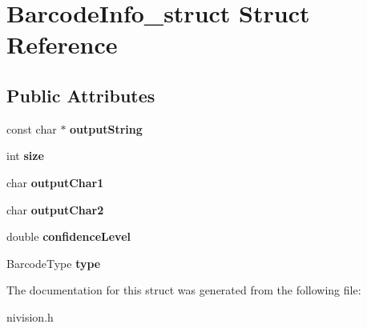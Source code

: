 \hypertarget{structBarcodeInfo__struct}{\section{\-Barcode\-Info\-\_\-struct \-Struct \-Reference}
\label{structBarcodeInfo__struct}
}
\subsection*{\-Public \-Attributes}
\begin{DoxyCompactItemize}
\item 
\hypertarget{structBarcodeInfo__struct_ab185776e7a618cbd98d26ac6726ace01}{const char $\ast$ {\bfseries output\-String}}\label{structBarcodeInfo__struct_ab185776e7a618cbd98d26ac6726ace01}

\item 
\hypertarget{structBarcodeInfo__struct_a1bcf8870fad45897861938e88889e2ff}{int {\bfseries size}}\label{structBarcodeInfo__struct_a1bcf8870fad45897861938e88889e2ff}

\item 
\hypertarget{structBarcodeInfo__struct_a27f2d0b60030e689236c43f314e12797}{char {\bfseries output\-Char1}}\label{structBarcodeInfo__struct_a27f2d0b60030e689236c43f314e12797}

\item 
\hypertarget{structBarcodeInfo__struct_a3c3fa62a3cea157db2007e0fdfa1a469}{char {\bfseries output\-Char2}}\label{structBarcodeInfo__struct_a3c3fa62a3cea157db2007e0fdfa1a469}

\item 
\hypertarget{structBarcodeInfo__struct_a0863171df66e08b2a949c18c838e4595}{double {\bfseries confidence\-Level}}\label{structBarcodeInfo__struct_a0863171df66e08b2a949c18c838e4595}

\item 
\hypertarget{structBarcodeInfo__struct_a280c5030ac56b2045b086345ed4bdf9d}{\-Barcode\-Type {\bfseries type}}\label{structBarcodeInfo__struct_a280c5030ac56b2045b086345ed4bdf9d}

\end{DoxyCompactItemize}


\-The documentation for this struct was generated from the following file\-:\begin{DoxyCompactItemize}
\item 
nivision.\-h\end{DoxyCompactItemize}
